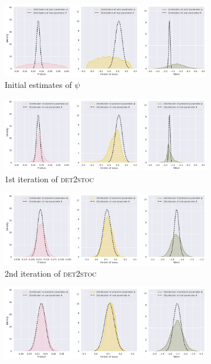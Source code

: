 \documentclass{kththesis}
\newcommand{\dettostoc}{\textsc{det2stoc}}
\begin{document}
\begin{figure}
\centering
{}
\captionsetup{size=footnotesize}
\begin{subfigure}{\linewidth}
  \includegraphics[width=1.0\linewidth]{img/windyslope/latent-representation/new/iter0}
  \caption{Initial estimates of $\psi$}
  \label{fig_3_parameters_0}
\end{subfigure}
\begin{subfigure}{\linewidth}
  \includegraphics[width=1.0\linewidth]{img/windyslope/latent-representation/new/latent_encoding_iter1}
  \caption{1st iteration of \dettostoc{}}
  \label{fig_3_parameters_0}
\end{subfigure}
\begin{subfigure}{\textwidth}
  \includegraphics[width=1.0\linewidth]{img/windyslope/latent-representation/new/latent_encoding_iter2}
  \caption{2nd iteration of \dettostoc{}}
\end{subfigure}
\begin{subfigure}{\textwidth}
  \includegraphics[width=1.0\linewidth]{img/windyslope/latent-representation/new/latent_encoding_iter3}

\end{subfigure}
\end{figure}
\end{document}
